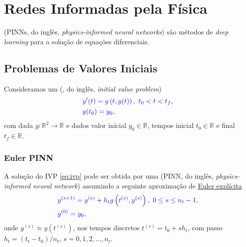 
\chapter{Redes Informadas pela Física}\label{cap_pinns}
\thispagestyle{fancy}

 (PINNs, do inglês, \textit{physics-informed neural networks}) são métodos de \textit{deep learning} para a solução de equações diferenciais.

\section{Problemas de Valores Iniciais}

Consideramos um  (, do inglês, \textit{initial value problem})
\begin{subequations}\label{eq:ivp}\hleq
  \begin{align}
    &y'(t) = g\left(t, y(t)\right), ~t_0 < t < t_f,\\
    &y(t_0) = y_0,
  \end{align}
\end{subequations}
com dada $g:\mathbb{R}^2\to\mathbb{R}$ e dados valor inicial $y_0\in\mathbb{R}$, tempos inicial $t_0\in\mathbb{R}$ e final $t_f\in\mathbb{R}$.

\subsection{Euler PINN}

A solução do IVP \eqref{eq:ivp} pode ser obtida por uma  (PINN, do inglês, \textit{physics-informed neural network}) assumindo a seguinte aproximação de \href{https://notaspedrok.com.br/notas/MatematicaNumericaII/cap_pvi_sec_euler.html}{Euler explícita}
\begin{subequations}\label{eq:ivp}\hleq
  \begin{align}
    &y^{(s+1)} = y^{(s)} + h_tg\left(t^{(s)}, y^{(s)}\right), ~0\leq s\leq n_t-1,\\
    &y^{(0)} = y_0,
  \end{align}
\end{subequations}
onde $y^{(s)} \approx y\left(t^{(s)}\right)$, nos tempos discretos $t^{(s)} = t_0 + sh_t$, com passo $h_t=(t_t-t_0)/n_t$, $s = 0, 1, 2, \dotsc, n_t$.

